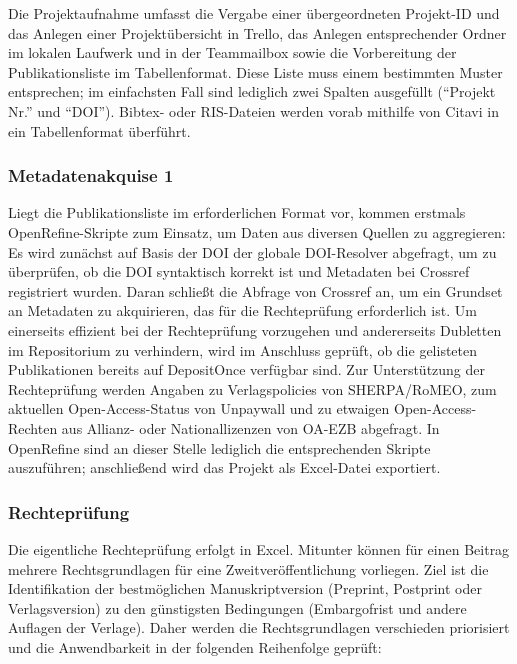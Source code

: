 \documentclass[a4paper,
fontsize=11pt,
oneside,
numbers=noperiodatend,
parskip=half-,
bibliography=totoc,
final
]{scrartcl}
\begin{document}
Die Projektaufnahme umfasst die Vergabe einer übergeordneten Projekt-ID
und das Anlegen einer Projektübersicht in Trello, das Anlegen
entsprechender Ordner im lokalen Laufwerk und in der Teammailbox sowie
die Vorbereitung der Publikationsliste im Tabellenformat. Diese Liste
muss einem bestimmten Muster entsprechen; im einfachsten Fall sind
lediglich zwei Spalten ausgefüllt (\enquote{Projekt Nr.} und
\enquote{DOI}). Bibtex- oder RIS-Dateien werden vorab mithilfe von
Citavi in ein Tabellenformat überführt.

\hypertarget{metadatenakquise-1}{%
\subsubsection{Metadatenakquise 1}\label{metadatenakquise-1}}

Liegt die Publikationsliste im erforderlichen Format vor, kommen
erstmals OpenRefine-Skripte zum Einsatz, um Daten aus diversen Quellen
zu aggregieren: Es wird zunächst auf Basis der DOI der globale
DOI-Resolver abgefragt, um zu überprüfen, ob die DOI syntaktisch korrekt
ist und Metadaten bei Crossref registriert wurden. Daran schließt die
Abfrage von Crossref an, um ein Grundset an Metadaten zu akquirieren,
das für die Rechteprüfung erforderlich ist. Um einerseits effizient bei
der Rechteprüfung vorzugehen und andererseits Dubletten im Repositorium
zu verhindern, wird im Anschluss geprüft, ob die gelisteten
Publikationen bereits auf DepositOnce verfügbar sind. Zur Unterstützung
der Rechteprüfung werden Angaben zu Verlagspolicies von SHERPA/RoMEO,
zum aktuellen Open-Access-Status von Unpaywall und zu etwaigen
Open-Access-Rechten aus Allianz- oder Nationallizenzen von OA-EZB
abgefragt. In OpenRefine sind an dieser Stelle lediglich die
entsprechenden Skripte auszuführen; anschließend wird das Projekt als
Excel-Datei exportiert.

\hypertarget{rechtepruxfcfung}{%
\subsubsection{Rechteprüfung}\label{rechtepruxfcfung}}

Die eigentliche Rechteprüfung erfolgt in Excel. Mitunter können für
einen Beitrag mehrere Rechtsgrundlagen für eine Zweitveröffentlichung
vorliegen. Ziel ist die Identifikation der bestmöglichen
Manuskriptversion (Preprint, Postprint oder Verlagsversion) zu den
günstigsten Bedingungen (Embargofrist und andere Auflagen der Verlage).
Daher werden die Rechtsgrundlagen verschieden priorisiert und die
Anwendbarkeit in der folgenden Reihenfolge geprüft:
\end{document}
